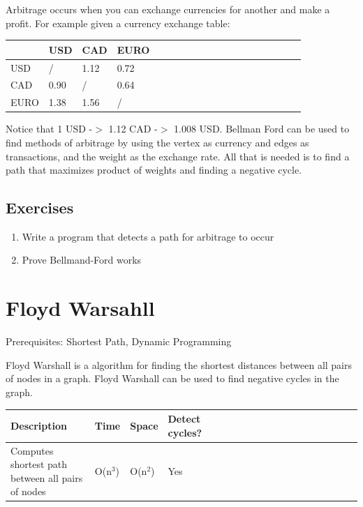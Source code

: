 \documentclass[11pt,oneside]{book}
\begin{document}
Arbitrage occurs when you can exchange currencies for another and make a profit. For example given a currency exchange table:

\vspace{10px}\begin{tabulary}{0.4\linewidth}{|l|l|l|l|l|l|l|l|l|l|l|l|l|l|l|l|l|l|l}\hline


   &
  USD &
  CAD &
  EURO\\
\hline


  USD &
  / &
  1.12 &
  0.72\\

  CAD &
  0.90 &
  / &
  0.64\\

  EURO &
  1.38 &
  1.56 &
  /\\

\hline\end{tabulary}

Notice that 1 USD -$>$ 1.12 CAD -$>$ 1.008 USD. Bellman Ford can be used to find methods of arbitrage by using the vertex as currency and edges as transactions, and the weight as the exchange rate. All that is needed is to find a path that maximizes product of weights and finding a negative cycle.

\subsection{Exercises}

\begin{enumerate}
\item Write a program that detects a path for arbitrage to occur
\item Prove Bellmand-Ford works
\end{enumerate}

        \section{ Floyd Warsahll }
        

Prerequisites:  Shortest Path, Dynamic Programming

Floyd Warshall is a algorithm for finding the shortest distances between all pairs of nodes in a graph. Floyd Warshall can be used to find negative cycles in the graph.

\vspace{10px}\begin{tabulary}{0.4\linewidth}{|l|l|l|l|l|l|l|l|l|l|l|l|l|l|l|l|l|l|l}\hline


  Description &
  Time &
  Space &
  Detect cycles?\\
\hline


  Computes shortest path between all pairs of nodes &
  O(n$^{3}$) &
  O(n$^{2}$) &
  Yes\\

\hline\end{tabulary}
\end{document}
